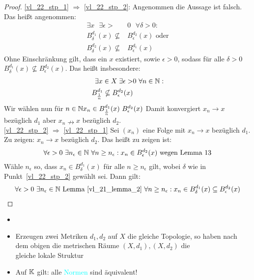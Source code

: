 \begin{proof}
\ref{vl_22_stp_1} $\Rightarrow$ \ref{vl_22_stp_2}: Angenommen die Aussage ist falsch. Das heißt angenommen:
\begin{align*}
	\exists x \text{ }\exists \epsilon > & 0 \text{ }\forall \delta > 0:\\
	B_\delta^{d_1}(x) \nsubseteq & B_\epsilon^{d_2}(x) \text{ oder} \\
	B_\delta^{d_2}(x) \nsubseteq & B_\epsilon^{d_1}(x)
\end{align*}
Ohne Einschränkung gilt, dass ein $x$ existiert, sowie $\epsilon >0$, sodass 
für alle $\delta > 0$ $B_\delta^{d_1}(x) \nsubseteq B_\epsilon^{d_2}(x)$. 
Das heißt insbesondere: 
\begin{align*}
	\exists x \in X \; \exists \epsilon > & 0 \text{ } \forall n \in \mathbb{N}: \\
	B_{\frac{1}{n}}^{d_1} \nsubseteq B_\epsilon^{d_2}(x)
\end{align*}
Wir wählen nun für $n \in \mathbb{N} x_n \in B_{\frac{1}{n}}^{d_1}(x) \ B_\epsilon^{d_2}(x)$
Damit konvergiert $x_n \rightarrow x$ bezüglich $d_1$ aber $x_n \nrightarrow x$ 
bezüglich $d_2$.\\
\ref{vl_22_stp_2} $\Rightarrow$ \ref{vl_22_stp_1} Sei $(x_n)$ eine Folge mit 
$x_n \rightarrow x$ bezüglich $d_1$. Zu zeigen: $x_n \rightarrow x$ bezüglich $d_2$. 
Das heißt zu zeigen ist:
\begin{align*}
	\forall \epsilon > 0 \text{ } \exists n_\epsilon \in \mathbb{N} \text{ } \forall n \geq n_\epsilon: 
	x_n \in B_\epsilon^{d_2}(x) \text{ wegen Lemma 13}
\end{align*}
Wähle $n_\epsilon$ so, dass $x_n \in B_\delta^{d_1}(x)$ für alle $n \geq n_\epsilon$ 
gilt, wobei $\delta$ wie in Punkt~\ref{vl_22_stp_2} gewählt sei. Dann gilt:
\begin{align*}
	\forall \epsilon > 0 \text{ } \exists n_\epsilon \in \mathbb{N} \text{ Lemma~\ref{vl_21_lemma_2} } \forall n \geq n_\epsilon :
	x_n \in B_\delta^{d_1}(x) \subseteq B_\epsilon^{d_2}(x)
\end{align*}
\end{proof}

\begin{Bemerkung}{
	\begin{itemize}
		\item[]
		\item Erzeugen zwei Metriken $d_1,d_2$ auf $X$ die gleiche Topologie, so 
		haben nach dem obigen die metrischen Räume $(X,d_1),(X,d_2)$ die \\
		\glqq gleiche lokale Struktur\grqq{}
		\item Auf $\mathbb{K}$ gilt: alle \textcolor{cyan}{Normen} sind äquivalent!
	\end{itemize}
}\end{Bemerkung}

